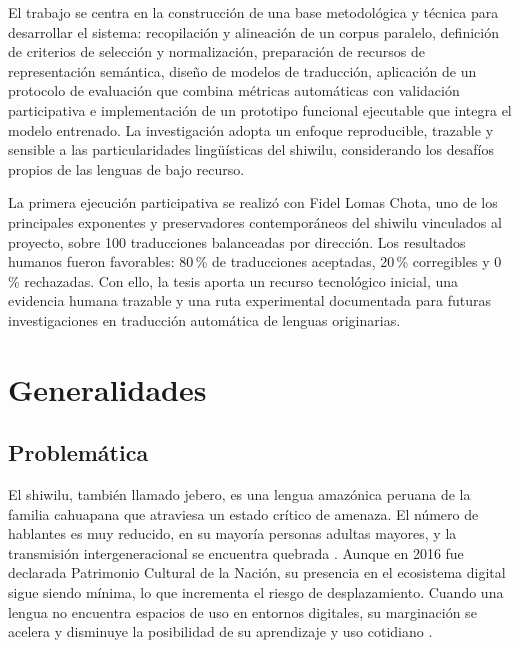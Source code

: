 \documentclass[12pt,a4paper,oneside]{book}
\begin{document}
El trabajo se centra en la construcción de una base metodológica y técnica para desarrollar el sistema: recopilación y alineación de un corpus paralelo, definición de criterios de selección y normalización, preparación de recursos de representación semántica, diseño de modelos de traducción, aplicación de un protocolo de evaluación que combina métricas automáticas con validación participativa e implementación de un prototipo funcional ejecutable que integra el modelo entrenado. La investigación adopta un enfoque reproducible, trazable y sensible a las particularidades lingüísticas del shiwilu, considerando los desafíos propios de las lenguas de bajo recurso.

La primera ejecución participativa se realizó con Fidel Lomas Chota, uno de los principales exponentes y preservadores contemporáneos del shiwilu vinculados al proyecto, sobre 100 traducciones balanceadas por dirección. Los resultados humanos fueron favorables: 80\,\% de traducciones aceptadas, 20\,\% corregibles y 0\,\% rechazadas. Con ello, la tesis aporta un recurso tecnológico inicial, una evidencia humana trazable y una ruta experimental documentada para futuras investigaciones en traducción automática de lenguas originarias.

\clearpage
\tableofcontents
\clearpage
\listoftables
\clearpage
\listoffigures
\clearpage

\chapter{Generalidades}\label{generalidades}

\section{Problemática}\label{problemuxe1tica}

El shiwilu, también llamado jebero, es una lengua amazónica peruana de la familia cahuapana que atraviesa un estado crítico de amenaza. El número de hablantes es muy reducido, en su mayoría personas adultas mayores, y la transmisión intergeneracional se encuentra quebrada \parencite{valenzuela2018}. Aunque en 2016 fue declarada Patrimonio Cultural de la Nación, su presencia en el ecosistema digital sigue siendo mínima, lo que incrementa el riesgo de desplazamiento. Cuando una lengua no encuentra espacios de uso en entornos digitales, su marginación se acelera y disminuye la posibilidad de su aprendizaje y uso cotidiano \parencite{ministeriodecultura2016,unesco2023}.
\end{document}
